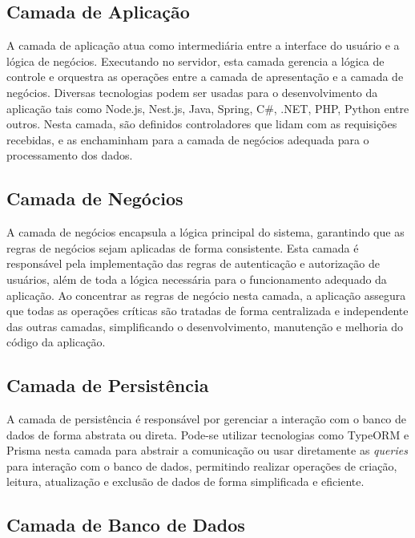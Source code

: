 \subsection{Camada de Aplicação}

A camada de aplicação atua como intermediária entre a interface do usuário e a lógica de negócios. Executando no servidor, esta camada gerencia a lógica de controle e orquestra as operações entre a camada de apresentação e a camada de negócios. Diversas tecnologias podem ser usadas para o desenvolvimento da aplicação tais como Node.js, Nest.js, Java, Spring, C\#, .NET, PHP, Python entre outros. Nesta camada, são definidos controladores que lidam com as requisições recebidas, e as enchaminham para a camada de negócios adequada para o processamento dos dados.

\subsection{Camada de Negócios}

A camada de negócios encapsula a lógica principal do sistema, garantindo que as regras de negócios sejam aplicadas de forma consistente. Esta camada é responsável pela implementação das regras de autenticação e autorização de usuários, além de toda a lógica necessária para o funcionamento adequado da aplicação. Ao concentrar as regras de negócio nesta camada, a aplicação assegura que todas as operações críticas são tratadas de forma centralizada e independente das outras camadas, simplificando o desenvolvimento, manutenção e melhoria do código da aplicação.

\subsection{Camada de Persistência}

A camada de persistência é responsável por gerenciar a interação com o banco de dados de forma abstrata ou direta. Pode-se utilizar tecnologias como TypeORM e Prisma nesta camada para abstrair a comunicação ou usar diretamente as \textit{queries} para interação com o banco de dados, permitindo realizar operações de criação, leitura, atualização e exclusão de dados de forma simplificada e eficiente.

\subsection{Camada de Banco de Dados}\label{subsec:camada_banco_de_dados}

